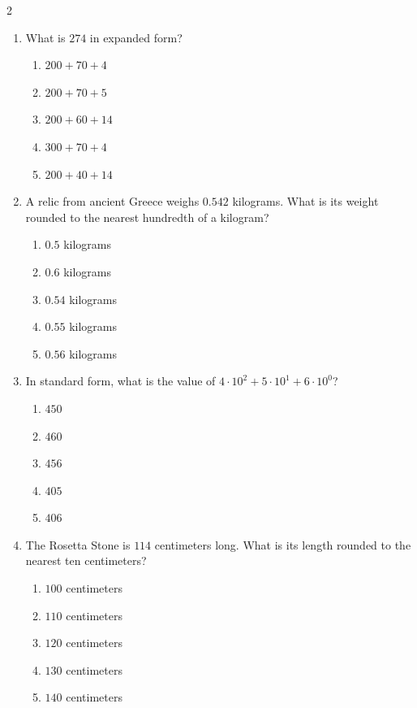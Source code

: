 \documentclass[10pt]{article}
\begin{document}
\begin{multicols}{2}
\begin{enumerate}[label=\textbf{Q\arabic*.}, leftmargin=*, itemsep=6pt, parsep=0pt]
  \item \small What is $274$ in expanded form?
  \begin{enumerate}[label=(\Alph*), leftmargin=0.6cm, nosep, itemsep=2pt]
    \item $200 + 70 + 4$
    \item $200 + 70 + 5$
    \item $200 + 60 + 14$
    \item $300 + 70 + 4$
    \item $200 + 40 + 14$
  \end{enumerate}

  \item \small A relic from ancient Greece weighs $0.542$ kilograms. What is its weight rounded to the nearest hundredth of a kilogram?
  \begin{enumerate}[label=(\Alph*), leftmargin=0.6cm, nosep, itemsep=2pt]
    \item $0.5$ kilograms
    \item $0.6$ kilograms
    \item $0.54$ kilograms
    \item $0.55$ kilograms
    \item $0.56$ kilograms
  \end{enumerate}

  \item \small In standard form, what is the value of $4 \cdot 10^2 + 5 \cdot 10^1 + 6 \cdot 10^0$?
  \begin{enumerate}[label=(\Alph*), leftmargin=0.6cm, nosep, itemsep=2pt]
    \item $450$
    \item $460$
    \item $456$
    \item $405$
    \item $406$
  \end{enumerate}

  \item \small The Rosetta Stone is $114$ centimeters long. What is its length rounded to the nearest ten centimeters?
  \begin{enumerate}[label=(\Alph*), leftmargin=0.6cm, nosep, itemsep=2pt]
    \item $100$ centimeters
    \item $110$ centimeters
    \item $120$ centimeters
    \item $130$ centimeters
    \item $140$ centimeters
  \end{enumerate}


\end{enumerate}
\end{multicols}
\end{document}
